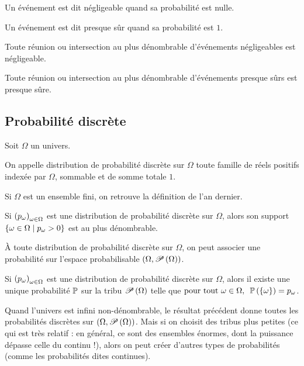 \begin{defi}
Un événement est dit négligeable quand sa probabilité est nulle.

Un événement est dit presque sûr quand sa probabilité est \(1\).
\end{defi}

\begin{prop}
Toute réunion ou intersection au plus dénombrable d'événements négligeables est négligeable.

Toute réunion ou intersection au plus dénombrable d'événements presque sûrs est presque sûre.
\end{prop}

\subsection{Probabilité discrète}

\begin{defi}
Soit \(\Omega\) un univers.

On appelle distribution de probabilité discrète sur \(\Omega\) toute famille de réels positifs indexée par \(\Omega\), sommable et de somme totale \(1\).

Si \(\Omega\) est un ensemble fini, on retrouve la définition de l'an dernier.
\end{defi}

\begin{prop}
Si \(\paren{p_\omega}_{\omega\in\Omega}\) est une distribution de probabilité discrète sur \(\Omega\), alors son support \(\accol{\omega\in\Omega\tq p_\omega>0}\) est au plus dénombrable.
\end{prop}

À toute distribution de probabilité discrète sur \(\Omega\), on peut associer une probabilité sur l'espace probabilisable \(\groupe{\Omega}[\P{\Omega}]\).

\begin{prop}
Si \(\paren{p_\omega}_{\omega\in\Omega}\) est une distribution de probabilité discrète sur \(\Omega\), alors il existe une unique probabilité \(\prem\) sur la tribu \(\P{\Omega}\) telle que \(\quantifs{\tpt\omega\in\Omega}\proba{\accol{\omega}}=p_\omega\).
\end{prop}

Quand l'univers est infini non-dénombrable, le résultat précédent donne toutes les probabilités discrètes sur \(\groupe{\Omega}[\P{\Omega}]\). Mais si on choisit des tribus plus petites (ce qui est très relatif : en général, ce sont des ensembles énormes, dont la puissance dépasse celle du continu !), alors on peut créer d'autres types de probabilités (comme les probabilités dites continues).

